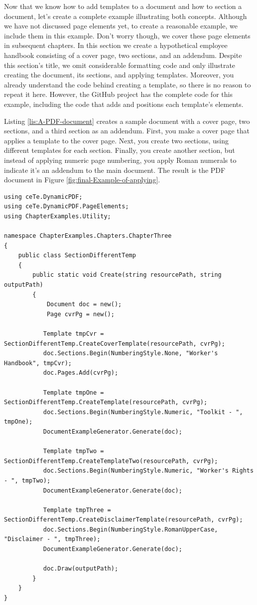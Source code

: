 \documentclass[american]{tufte-book}
\numberwithin{equation}{section}
\numberwithin{figure}{section}
\begin{document}
Now that we know how to add templates to a document and how to section
a document, let's create a complete example illustrating both concepts.
Although we have not discussed page elements yet, to create a reasonable
example, we include them in this example. Don't worry though, we cover
these page elements in subsequent chapters. In this section we create
a hypothetical employee handbook consisting of a cover page, two sections,
and an addendum. Despite this section's title, we omit considerable
formatting code and only illustrate creating the document, its sections,
and applying templates. Moreover, you already understand the code behind creating
a template, so there is no reason to repeat it here. However, the
GitHub project has the complete code for this example, including the
code that adds and positions each template's elements. 

Listing \ref{lis:A-PDF-document} creates a sample document with a
cover page, two sections, and a third section as an addendum. First,
you make a cover page that applies a template to the cover page. Next,
you create two sections, using different templates for each section.
Finally, you create another section, but instead of applying numeric
page numbering, you apply Roman numerals to indicate it's an addendum
to the main document. The result is the PDF document in Figure \ref{fig:final-Example-of-applying}.

\bgroup{}
\begin{lstlisting}[caption={A PDF document with multiple sections.},label={lis:A-PDF-document},basicstyle={\footnotesize\ttfamily},breaklines=true]
using ceTe.DynamicPDF;
using ceTe.DynamicPDF.PageElements;
using ChapterExamples.Utility;

namespace ChapterExamples.Chapters.ChapterThree
{
    public class SectionDifferentTemp
    {
        public static void Create(string resourcePath, string outputPath)
        {
            Document doc = new();
            Page cvrPg = new();
           
           Template tmpCvr = SectionDifferentTemp.CreateCoverTemplate(resourcePath, cvrPg);
           doc.Sections.Begin(NumberingStyle.None, "Worker's Handbook", tmpCvr);
           doc.Pages.Add(cvrPg);

           Template tmpOne = SectionDifferentTemp.CreateTemplate(resourcePath, cvrPg);
           doc.Sections.Begin(NumberingStyle.Numeric, "Toolkit - ", tmpOne);
           DocumentExampleGenerator.Generate(doc);

           Template tmpTwo = SectionDifferentTemp.CreateTemplateTwo(resourcePath, cvrPg);
           doc.Sections.Begin(NumberingStyle.Numeric, "Worker's Rights - ", tmpTwo);
           DocumentExampleGenerator.Generate(doc);

           Template tmpThree = SectionDifferentTemp.CreateDisclaimerTemplate(resourcePath, cvrPg);
           doc.Sections.Begin(NumberingStyle.RomanUpperCase, "Disclaimer - ", tmpThree);
           DocumentExampleGenerator.Generate(doc);

           doc.Draw(outputPath);
        }
    }
}
\end{lstlisting}
\leavevmode\egroup
\end{document}
